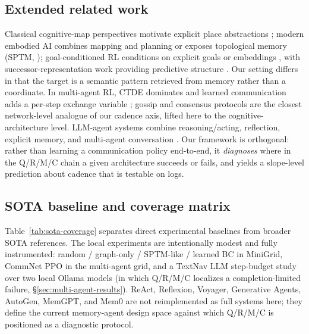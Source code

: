 \documentclass{article}
\begin{document}
\subsection{Extended related work}
\label{app:related-work-extended}

Classical cognitive-map perspectives motivate explicit place abstractions \citep{tolman1948cognitive,okeefe1978hippocampus,kuipers2000spatial}; modern embodied AI combines mapping and planning \citep{gupta2017cognitive} or exposes topological memory (SPTM, \citealp{savinov2018semi}); goal-conditioned RL conditions on explicit goals or embeddings \citep{andrychowicz2017hindsight,ghosh2021learning}, with successor-representation work providing predictive structure \citep{dayan1993improving,stachenfeld2017hippocampus,momennejad2017successor}. Our setting differs in that the target is a semantic pattern retrieved from memory rather than a coordinate. In multi-agent RL, CTDE dominates \citep{lowe2017maddpg,foerster2018ctde} and learned communication adds a per-step exchange variable \citep{sukhbaatar2016commnet,foerster2016learning}; gossip and consensus protocols \citep{boyd2006gossip,xiao2007distributed} are the closest network-level analogue of our cadence axis, lifted here to the cognitive-architecture level. LLM-agent systems combine reasoning/acting, reflection, explicit memory, and multi-agent conversation \citep{yao2022react,shinn2023reflexion,wang2023voyager,park2023generative,wu2023autogen,packer2023memgpt,chhikara2025mem0}. Our framework is orthogonal: rather than learning a communication policy end-to-end, it \emph{diagnoses} where in the Q/R/M/C chain a given architecture succeeds or fails, and yields a slope-level prediction about cadence that is testable on logs.

\subsection{SOTA baseline and coverage matrix}
\label{app:sota-coverage}

Table~\ref{tab:sota-coverage} separates direct experimental baselines from broader SOTA references. The local experiments are intentionally modest and fully instrumented: random / graph-only / SPTM-like / learned BC in MiniGrid, CommNet PPO in the multi-agent grid, and a TextNav LLM step-budget study over two local Ollama models (in which Q/R/M/C localizes a completion-limited failure, \S\ref{sec:multi-agent-results}). ReAct, Reflexion, Voyager, Generative Agents, AutoGen, MemGPT, and Mem0 are not reimplemented as full systems here; they define the current memory-agent design space against which Q/R/M/C is positioned as a diagnostic protocol.
\end{document}

